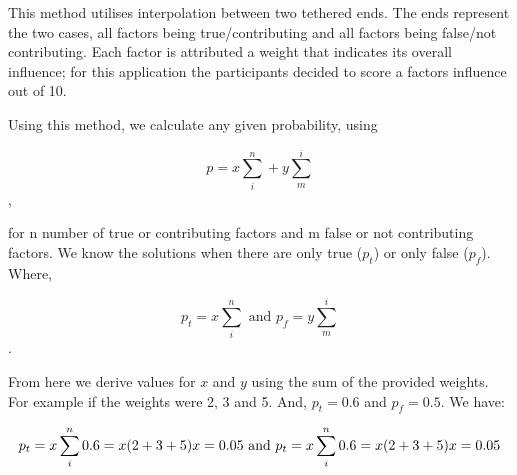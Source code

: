 This method utilises interpolation between two tethered ends. The ends represent the two cases, all factors being true/contributing and all factors being false/not contributing. Each factor is attributed a weight that indicates its overall influence; for this application the participants decided to score a factors influence out of 10.

Using this method, we calculate any given probability, using

\begin{equation}
p=x\sum_{i}^{n} + y\sum_{m}^{i} 
\end{equation},

for n number of true or contributing factors and m false or not contributing factors. We know the solutions when there are only true ($p_t$) or only false ($p_f$). Where,

\begin{equation}
p_t=x\sum_{i}^{n} 
\text{ and }
p_f=y\sum_{m}^{i}
\end{equation}.

From here we derive values for $x$ and $y$ using the sum of the provided weights. For example if the weights were 2, 3 and 5. And, $p_t=0.6$ and $p_f=0.5$. We have:

\begin{equation}
p_t=x\sum_{i}^{n}\\
0.6=x(2+3+5)
x=0.05\\
\text{ and }
p_t=x\sum_{i}^{n}
0.6=x(2+3+5)
x=0.05
\end{equation}

